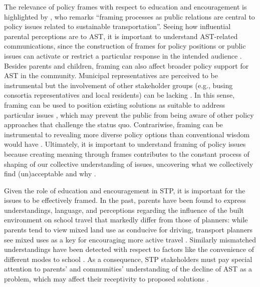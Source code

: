 \documentclass[preprint, 3p,
authoryear]{elsarticle} %
\begin{document}
The relevance of policy frames with respect to education and
encouragement is highlighted by \citet{beland2014developing}, who
remarks ``framing processes as public relations are central to policy
issues related to sustainable transportation''. Seeing how influential
parental perceptions are to AST, it is important to understand
AST-related communications, since the construction of frames for policy
positions or public issues can activate or restrict a particular
response in the intended audience
\citep{panFramingAnalysisApproach1993}. Besides parents and children,
framing can also affect broader policy support for AST in the community.
Municipal representatives are perceived to be instrumental but the
involvement of other stakeholder groups (e.g., busing consortia
representatives and local residents) can be lacking
\citep{buttazzoniSupportingActiveSchool2018}. In this sense, framing can
be used to position existing solutions as suitable to address particular
issues \citep{mahFramecriticalPolicyAnalysis2014}, which may prevent the
public from being aware of other policy approaches that challenge the
status quo. Contrariwise, framing can be instrumental to revealing more
diverse policy options than conventional wisdom would have
\citep{bosomworth2015climate}. Ultimately, it is important to understand
framing of policy issues because creating meaning through frames
contributes to the constant process of shaping of our collective
understanding of issues, uncovering what we collectively find
(un)acceptable and why \citep{beland2014developing}.

Given the role of education and encouragement in STP, it is important
for the issues to be effectively framed. In the past, parents have been
found to express understandings, language, and perceptions regarding the
influence of the built environment on school travel that markedly differ
from those of planners: while parents tend to view mixed land use as
conducive for driving, transport planners see mixed uses as a key for
encouraging more active travel \citep{buliungLivingJourneySchool2021}.
Similarly mismatched understandings have been detected with respect to
factors like the convenience of different modes to school
\citep{langUnderstandingModalChoice2011}. As a consequence, STP
stakeholders must pay special attention to parents' and communities'
understanding of the decline of AST as a problem, which may affect their
receptivity to proposed solutions
\citep{buttazzoniSupportingActiveSchool2018}.
\end{document}
